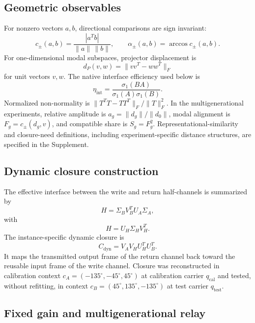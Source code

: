 \documentclass[aps,pre,preprint,superscriptaddress,nofootinbib]{revtex4-2}
\newcommand{\Cdyn}{C_{\mathrm{dyn}}}
\begin{document}
\subsection{Geometric observables}

For nonzero vectors $a,b$, directional comparisons are sign invariant:
\begin{equation}
 c_{\pm}(a,b)=\frac{|a^Tb|}{\|a\|\,\|b\|},\qquad
 \alpha_{\pm}(a,b)=\arccos c_{\pm}(a,b).
\end{equation}
For one-dimensional modal subspaces, projector displacement is
\begin{equation}
 d_P(v,w)=\|vv^T-ww^T\|_F
\end{equation}
for unit vectors $v,w$. The native interface efficiency used below is
\begin{equation}
 \eta_{\mathrm{int}}=\frac{\sigma_1(BA)}{\sigma_1(A)\sigma_1(B)}.
\end{equation}
Normalized non-normality is $\|T^TT-TT^T\|_F/\|T\|_F^2$. In the multigenerational experiments, relative amplitude is $a_g=\|d_g\|/\|d_0\|$, modal alignment is $F_g=c_{\pm}(d_g,v)$, and compatible share is $S_g=F_g^2$. Representational-similarity and closure-need definitions, including experiment-specific distance structures, are specified in the Supplement.

\subsection{Dynamic closure construction}

The effective interface between the write and return half-channels is summarized by
\begin{equation}
 H=\Sigma_BV_B^TU_A\Sigma_A,
\end{equation}
with
\begin{equation}
 H=U_H\Sigma_HV_H^T.
\end{equation}
The instance-specific dynamic closure is
\begin{equation}
 \boxed{\Cdyn=V_AV_HU_H^TU_B^T.}
\end{equation}
It maps the transmitted output frame of the return channel back toward the reusable input frame of the write channel. Closure was reconstructed in calibration context $c_A=(-135^\circ,-45^\circ,45^\circ)$ at calibration carrier $q_{\mathrm{cal}}$ and tested, without refitting, in context $c_B=(45^\circ,135^\circ,-135^\circ)$ at test carrier $q_{\mathrm{test}}$.

\subsection{Fixed gain and multigenerational relay}
\end{document}
